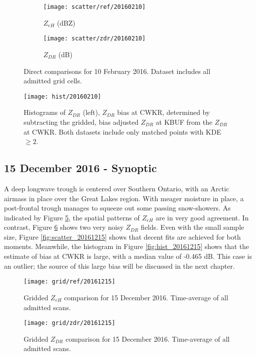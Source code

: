 \begin{figure}[H]
\centering
   \begin{subfigure}{0.49\linewidth} \centering
     \texttt{[image: scatter/ref/20160210]}
     \caption{$Z_{eH}$ (dBZ)}\label{fig:scatter_ref_20160210}
   \end{subfigure}
   \begin{subfigure}{0.49\linewidth} \centering
     \texttt{[image: scatter/zdr/20160210]}
     \caption{$Z_{DR}$ (dB)}\label{fig:scatter_zdr_20160210}
   \end{subfigure}
\caption{Direct comparisons for 10 February 2016. Dataset includes all admitted grid cells.} \label{fig:scatter_20160210}
\end{figure}

\begin{figure}[H]
\texttt{[image: hist/20160210]}\centering
\caption{Histograms of $Z_{DR}$ (left), $Z_{DR}$ bias at CWKR, determined by subtracting the gridded, bias adjusted $Z_{DR}$ at KBUF from the $Z_{DR}$ at
CWKR. Both datasets include only matched points with KDE $\geq 2$. } 
\label{fig:hist_20160210}
\end{figure}

\subsection{15 December 2016 - Synoptic}
A deep longwave trough is centered over Southern Ontario, with an Arctic airmass in place over the Great Lakes region. With meager moisture in place, a
post-frontal trough manages to squeeze out some passing snow-showers. As indicated by Figure \ref{fig:grid_ref_20161215}, the spatial patterns of $Z_{eH}$ are in very good agreement. In contrast, Figure \ref{fig:grid_zdr_20161215} shows two very noisy $Z_{DR}$ fields. Even with the small sample size, Figure \ref{fig:scatter_20161215} shows that decent fits are achieved for both moments. Meanwhile, the histogram in Figure \ref{fig:hist_20161215} shows that the estimate of bias at CWKR is large, with a median value of -0.465 dB. This case is an outlier; the source of this large bias will be discussed in the next chapter. 
\begin{figure}[p]
\texttt{[image: grid/ref/20161215]}
\caption{Gridded $Z_{eH}$ comparison for 15 December 2016. Time-average of all admitted scans.} 
\label{fig:grid_ref_20161215}
\end{figure}

\begin{figure}[p]
\texttt{[image: grid/zdr/20161215]}
\caption{Gridded $Z_{DR}$ comparison for 15 December 2016. Time-average of all admitted scans.} 
\label{fig:grid_zdr_20161215}
\end{figure}

